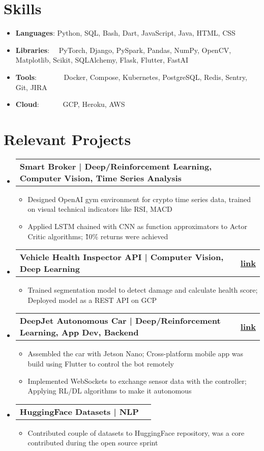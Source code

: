 \documentclass[letterpaper,10pt]{article}
\makeatletter
\newcommand{\resumeItemClean}[1]{
    \item\small{
        {#1 \vspace{-2pt}}
    }
}
\newcommand{\resumeItem}[2]{
  \item\small{
    \textbf{#1}{: #2 \vspace{-2pt}}
  }
}
\newcommand{\projectheading}[3]{
    \vspace{-1pt}\item
        \begin{tabular*}{0.97\textwidth}{l@{\extracolsep{\fill}}r}
            \textbf{#1} & \textbf{#2} #3\\
    \end{tabular*}\vspace{-5pt}
}
\newcommand{\resumeSubItem}[2]{\resumeItem{#1}{#2}\vspace{-4pt}}
\newcommand{\resumeSubHeadingListStart}{\begin{itemize}[leftmargin=*]}
\newcommand{\resumeSubHeadingListEnd}{\end{itemize}}
\newcommand{\resumeItemListStart}{\begin{itemize}}
\newcommand{\resumeItemListEnd}{\end{itemize}\vspace{-5pt}}
\makeatother
\begin{document}
\section{Skills}
    \resumeSubHeadingListStart
    \resumeSubItem{Languages}{Python, SQL, Bash, Dart, JavaScript, Java, HTML, CSS}
    \resumeSubItem{Libraries}{~~PyTorch, Django, PySpark, Pandas, NumPy, OpenCV, Matplotlib, Scikit, SQLAlchemy, Flask, Flutter, FastAI}
    \resumeSubItem{Tools}{~~~~~~~Docker, Compose, Kubernetes, PostgreSQL, Redis, Sentry, Git, JIRA}
    \resumeSubItem{Cloud}{~~~~~~GCP, Heroku, AWS}
\resumeSubHeadingListEnd

\section{Relevant Projects}
    \resumeSubHeadingListStart
        \projectheading{Smart Broker | Deep/Reinforcement Learning, Computer Vision, Time Series Analysis}{}{}
            \resumeItemListStart
                \resumeItemClean
                    {Designed OpenAI gym environment for crypto time series data, trained on visual technical indicators like RSI, MACD}
                \resumeItemClean
                    {Applied LSTM chained with CNN as function approximators to Actor Critic algorithms; \~10\% returns were achieved}
            \resumeItemListEnd
        \projectheading{Vehicle Health Inspector API | Computer Vision, Deep Learning}{\href{https://finddentsonmycar.tech/}{link}}{}
            \resumeItemListStart
                \resumeItemClean
                    {Trained segmentation model to detect damage and calculate health score; Deployed model as a REST API on GCP}
            \resumeItemListEnd
        \projectheading{DeepJet Autonomous Car | Deep/Reinforcement Learning, App Dev, Backend}{\href{https://github.com/vinaykudari/eureka-bot}{link}}{}
            \resumeItemListStart
                \resumeItemClean
                    {Assembled the car with Jetson Nano; Cross-platform mobile app was build using Flutter to control the bot remotely}
                \resumeItemClean
                    {Implemented WebSockets to exchange sensor data with the controller; Applying RL/DL algorithms to make it autonomous}
            \resumeItemListEnd
        \projectheading{HuggingFace Datasets | NLP }{\href{}{}}{}
            \resumeItemListStart
                \resumeItemClean
                    {Contributed couple of datasets to HuggingFace repository, was a core contributed during the open source sprint}
            \resumeItemListEnd
    \resumeSubHeadingListEnd
    
\end{document}

